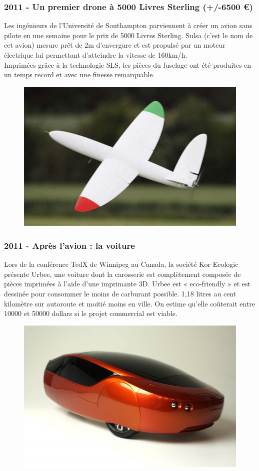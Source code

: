 \documentclass{article}
\begin{document}
\subsubsection{2011 - Un premier drone à 5000 Livres Sterling (+/-6500 \euro)}
Les ingénieurs de l'Université de Southampton parviennent à créer un avion sans pilote en une semaine pour le prix de 5000 Livres Sterling. Sulsa (c'est le nom de cet avion) mesure prêt de 2m d'envergure et est propulsé par un moteur électrique lui permettant d'atteindre la vitesse de 160km/h.\\
Imprimées grâce à la technologie SLS, les pièces du fuselage ont été produites en un temps record et avec une finesse remarquable.
\begin{figure}[h!]
\centering
\includegraphics[scale=0.4]{./images/sulsa.jpg}
\end{figure}
\subsubsection{2011 - Après l'avion : la voiture}
Lors de la conférence TedX de Winnipeg au Canada, la société Kor Ecologic présente Urbee, une voiture dont la carosserie est complètement composée de pièces imprimées à l'aide d'une imprimante 3D. Urbee est « eco-friendly » et est dessinée pour consommer le moins de carburant possible. 1,18 litres au cent kilomètre sur autoroute et moitié moins en ville. On estime qu'elle coûterait entre 10000 et 50000 dollars si le projet commercial est viable.
\begin{figure}[h!]
\centering
\includegraphics[scale=0.3]{./images/urbee.jpg}
\end{figure}
\end{document}
